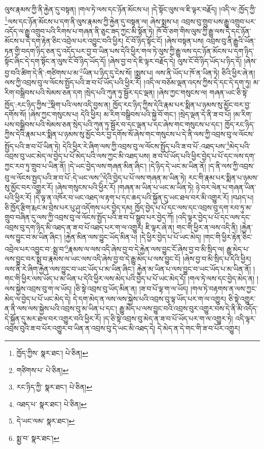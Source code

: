 ལུས་རྣམས་ཀྱི་ནི་རྐྱེན་དུ་བསྟན། །གལ་ཏེ་ལས་དང་ཉོན་མོངས་པ། །དེ་སྟོང་ལུས་ལ་ཇི་ལྟར་བརྗོད། །འདི་ལ་:ཁྱོད་ཀྱི་\footnote{ཁྱོད་ཀྱིས་  སྣར་ཐང་།  པེ་ཅིན། }ལས་དང་ཉོན་མོངས་པ་དག་ནི་ལུས་རྣམས་ཀྱི་རྐྱེན་དུ་བསྟན་ལ། ཞེས་སྨྲས་པ། འབྲས་བུ་གྲུབ་པས་རྒྱུ་འགྲུབ་པར་འདོད་ལ་རྒྱུ་འགྲུབ་པའི་རིགས་པ་གཞན་ནི་ཅུང་ཟད་ཀྱང་མི་སྟོན་ཏེ། ཁོ་བོ་ཅག་གིས་ལུས་ཀྱི་རྒྱུ་ལས་དེ་དང་ཉོན་མོངས་པ་དེ་དག་རྟེན་ཅིང་འབྲེལ་པར་འབྱུང་བའི་ཕྱིར། ངོ་བོ་ཉིད་སྟོང་ངོ། །ཞེས་བསྟན་པས། འབྲས་བུ་ནི་རྒྱུའི་ཡོན་ཏན་གྱི་བདག་ཉིད་ཅན་དུ་འདོད་པར་བྱ་བ་ཡིན་པས་དེའི་ཕྱིར་གལ་ཏེ་ལུས་ཀྱི་རྒྱུ་ལས་དང་ཉོན་མོངས་པ་དག་ཉིད་སྟོང་ཞིང་དེ་དག་སྟོང་ན་ལུས་ངོ་བོ་ཉིད་ཡོད་དོ། །ཞེས་བྱ་བ་དེ་ཇི་ལྟར་བརྗོད་དེ། ལུས་ངོ་བོ་ཉིད་ཡོད་པ་ཉིད་དོ། །ཞེས་བྱ་བའི་ཚིག་དེ་ནི་:གཙིགས་པ་མ་\footnote{གཙིགས་པ་  པེ་ཅིན། }ཡིན་པ་ཉིད་དུ་ངེས་སོ། །སྨྲས་པ། ལས་ནི་ཡོད་པ་ཁོ་ན་ཡིན་ཏེ། ཅིའི་ཕྱིར་ཞེ་ན། ལས་ཀྱི་འབྲས་བུ་ལ་ལོངས་སྤྱོད་པའི་ཟ་བ་པོ་ཡོད་པའི་ཕྱིར་རོ། །འདི་ལ་བཅོམ་ལྡན་འདས་ཀྱིས་དེ་དང་དེ་དག་ཏུ། མ་རིག་བསྒྲིབས་པའི་སེམས་ཅན་དག །སྲེད་པའི་ཀུན་ཏུ་སྦྱོར་དང་ལྡན། །ཞེས་ཀྱང་གསུངས་ལ། གཞན་ཡང་ཅི་སྟེ་ཁྱོད་:རང་ཉིད་ཀྱིས་\footnote{རང་ཉིད་ཀྱི་  སྣར་ཐང་།  པེ་ཅིན། }སྡིག་པའི་ལས་འདི་བྱས་ན། ཁྱོད་རང་ཉིད་ཀྱིས་དེའི་རྣམ་པར་སྨིན་པ་ཉམས་སུ་མྱོང་བར་བྱ་དགོས་སོ། །ཞེས་ཀྱང་གསུངས་པ། དེའི་ཕྱིར། མ་རིག་བསྒྲིབས་པའི་སྐྱེ་བོ་གང་། །སྲེད་ལྡན་དེ་ནི་ཟ་བ་པོ། །མ་རིག་པས་བསྒྲིབས་པའི་སེམས་ཅན་སྲེད་པའི་ཀུན་ཏུ་སྦྱོར་བ་དང་ལྡན་པ་དང་ཞེས་གང་གསུངས་པ་དང་། ཁྱོད་རང་ཉིད་ཀྱིས་དེའི་རྣམ་པར་སྨིན་པ་ཉམས་སུ་མྱོང་བར་བྱ་དགོས་སོ་ཞེས་གང་གསུངས་པ་དེ་ནི་ལས་ཀྱི་འབྲས་བུ་ལ་ལོངས་སྤྱོད་པའི་ཟ་བ་པོ་ཡིན་ཏེ། དེའི་ཕྱིར་རེ་ཞིག་ལས་ཀྱི་འབྲས་བུ་ལ་ལོངས་སྤྱོད་པའི་ཟ་བ་པོ་:འཐད་པས་\footnote{འཐད་པ་  སྣར་ཐང་།  པེ་ཅིན། }མེད་པའི་འབྲས་བུ་ཡང་མེད་ལ་བྱེད་པ་པོ་མེད་པའི་ལས་ཀྱང་མི་འཐད་པས། ཟ་བ་པོ་ཡོད་པའི་ཕྱིར་བྱེད་པ་པོ་དང་ལས་དག་ཀྱང་རབ་ཏུ་གྲུབ་པ་ཡིན་ནོ། །དེ་ཡང་བྱེད་ལས་གཞན་མིན་ཞིང་། །དེ་ཉིད་དེ་ཡང་མ་ཡིན་ནོ། །ད་ནི་ལས་ཀྱི་འབྲས་བུ་ལ་ལོངས་སྤྱད་པའི་ཟ་བ་པོ་:དེ་ཡང་ལས་\footnote{དེ་ཡང་ལམ་  སྣར་ཐང་། }དེའི་བྱེད་པ་པོ་ལས་གཞན་མ་ཡིན་ཏེ། རང་གི་རྣམ་པར་སྨིན་པ་ཉམས་སུ་མྱོང་བར་འགྱུར་རོ། །ཞེས་གསུངས་པའི་ཕྱིར་རོ། །གཞན་མ་ཡིན་པ་ཡང་མ་ཡིན་ཏེ། ཉེ་བར་ལེན་པ་གཞན་ཡིན་པའི་ཕྱིར་རོ། །དེ་ལྟ་ན་འཁོར་བ་ཡང་འཐད་ལ་རྟག་པ་དང་ཆད་པའི་སྐྱོན་དུ་ཡང་ཐལ་བར་མི་འགྱུར་རོ། །བཤད་པ། ཅི་ཁྱོད་རྩིག་རྨང་མ་བྲེས་པར་པུ་ཤུ་འདོགས་པར་བྱེད་དམ། ཁྱོད་བྱེད་པ་པོ་དང་ལས་དང་འབྲས་བུ་དག་རབ་ཏུ་མ་གྲུབ་བཞིན་དུ་ལས་ཀྱི་འབྲས་བུ་ལ་ལོངས་སྤྱོད་པའི་ཟ་བ་པོ་སྒྲུབ་པར་བྱེད་ཀོ། །འདི་ལྟར་བྱེད་པ་པོ་དང་ལས་དང་འབྲས་བུ་དག་ཉིད་མི་འཐད་ན་ཟ་བ་པོ་འཐད་པར་ག་ལ་འགྱུར། ཇི་ལྟར་ཞེ་ན། གང་གི་ཕྱིར་ན་ལས་འདི་ནི། །རྐྱེན་ལས་བྱུང་བ་མ་ཡིན་ཞིང་། །རྐྱེན་མིན་ལས་བྱུང་ཡོད་མིན་པ། །དེ་ཕྱིར་བྱེད་པ་པོ་ཡང་མེད། །གང་གི་ཕྱིར་རྟེན་ཅིང་འབྲེལ་པར་འབྱུང་བ་:སྨྲ་བ་\footnote{སྨྱ་བ་  སྣར་ཐང་། }རྣམས་ལ་ལས་འདི་ཞེས་བྱ་བ་དེ་རྐྱེན་ལས་བྱུང་ངོ་ཞེས་བྱ་བ་མི་སྲིད་ལ། རྒྱུ་མེད་པ་ལས་བྱུང་བར་སྨྲ་བ་རྣམས་ལ་ཡང་ལས་འདི་ཞེས་བྱ་བ་དེ་རྒྱུ་མེད་པ་ལས་བྱུང་ངོ། །ཞེས་བྱ་བ་མི་སྲིད་པ་དེའི་ཕྱིར། ལས་ནི་རེ་ཞིག་རྐྱེན་ལས་བྱུང་བ་ཡང་ཡོད་པ་མ་ཡིན་ཞིང་། རྐྱེན་མ་ཡིན་པ་ལས་བྱུང་བ་ཡང་ཡོད་པ་མ་ཡིན་ནོ། །གང་གི་ཕྱིར་ལས་ཡོད་པ་མ་ཡིན་པ་དེའི་ཕྱིར་ལས་མེད་པའི་བྱེད་པ་པོ་ཡང་མེད་དོ། །གལ་ཏེ་ལས་དང་བྱེད་མེད་ན། །ལས་སྐྱེས་འབྲས་བུ་ག་ལ་ཡོད། །ཅི་སྟེ་འབྲས་བུ་ཡོད་མིན་ན། །ཟ་བ་པོ་ལྟ་ག་ལ་ཡོད། །གལ་ཏེ་བརྟགས་ན་ལས་ཀྱང་མེད་ལ་བྱེད་པ་པོ་ཡང་མེད་དེ། དེ་དག་མེད་ན་ལས་ལས་སྐྱེས་པའི་འབྲས་བུ་ལྟ་ཡོད་པར་ག་ལ་འགྱུར། ཅི་སྟེ་འགྱུར་ན་ནི་ལས་ལས་སྐྱེས་པའི་འབྲས་བུ་མ་ཡིན་པ་དང་། རྒྱུ་མེད་པ་ལས་བྱུང་བའི་འབྲས་བུར་འགྱུར་བས་དེ་ནི་མི་འདོད་དེ་སྐྱོན་དུ་མར་ཐལ་བར་འགྱུར་བའི་ཕྱིར་རོ། །ད་ཅི་སྟེ་འབྲས་བུ་མེད་ན་ཟ་བ་པོ་ཡོད་པར་ག་ལ་འགྱུར་ཏེ། འདི་ལྟར་འབྲས་བུའི་ཟ་བ་པོར་འགྱུར་བ་ཡིན་ན་འབྲས་བུ་དེ་ཡང་མི་འཐད་དེ། དེ་མེད་ན་དེ་གང་གི་ཟ་བ་པོར་འགྱུར། 
